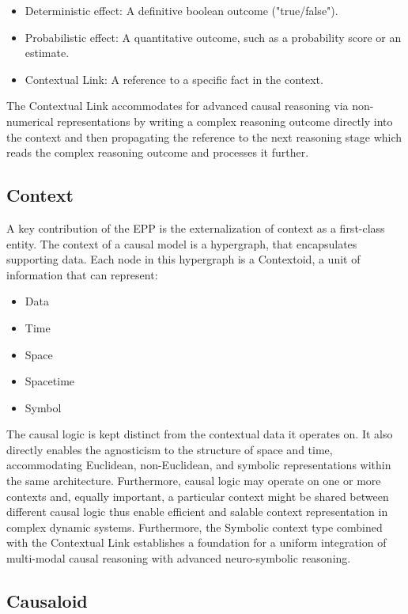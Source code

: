 \begin{itemize}
    \item Deterministic effect: A definitive boolean outcome ("true/false").
    \item Probabilistic effect: A quantitative outcome, such as a probability score or an estimate.
    \item Contextual Link: A reference to a specific fact in the context.
\end{itemize}

The Contextual Link accommodates for advanced causal reasoning via non-numerical representations by
writing a complex reasoning outcome directly into the context and then propagating the reference to
the next reasoning stage which reads the complex reasoning outcome and processes it further.

\subsection{Context}
\label{sec:epp_context}

A key contribution of the EPP is the externalization of context as a first-class entity.
The context of a causal model is a hypergraph, that encapsulates supporting data.
Each node in this hypergraph is a Contextoid, a unit of information that can represent:

\begin{itemize}
    \item Data
    \item Time
    \item Space
    \item Spacetime
    \item Symbol
\end{itemize}


The causal logic is kept distinct from the contextual data it operates on. It also directly enables the agnosticism to the structure of space and time, accommodating Euclidean, non-Euclidean, and symbolic representations within the same architecture. Furthermore,  causal logic may operate on one or more contexts and, equally important, a particular context might be shared between different causal logic thus enable efficient and salable context representation in complex dynamic systems. Furthermore, the Symbolic context type combined with the Contextual Link establishes a foundation for a uniform integration of multi-modal causal reasoning with advanced neuro-symbolic reasoning.

\subsection{Causaloid}
\label{sec:epp_causaloid}

